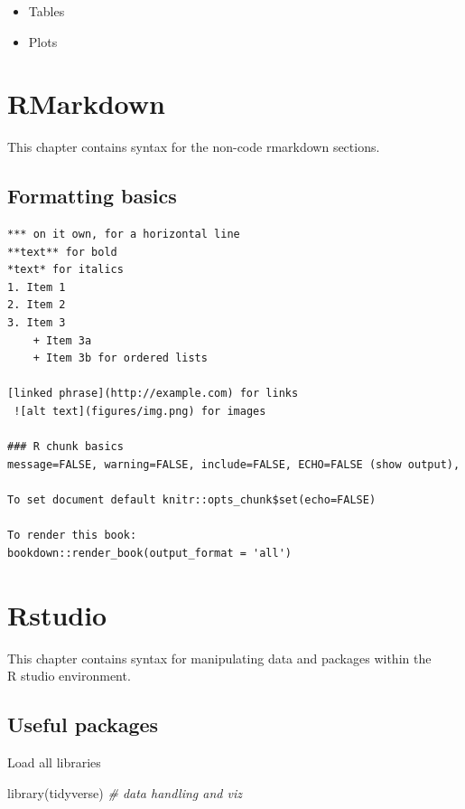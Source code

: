 \documentclass[
]{article}
\newenvironment{Shaded}{\begin{snugshade}}{\end{snugshade}}
\newcommand{\CommentTok}[1]{\textcolor[rgb]{0.56,0.35,0.01}{\textit{#1}}}
\newcommand{\FunctionTok}[1]{\textcolor[rgb]{0.00,0.00,0.00}{#1}}
\newcommand{\NormalTok}[1]{#1}
\providecommand{\tightlist}{%
  \setlength{\itemsep}{0pt}\setlength{\parskip}{0pt}}
\begin{document}
\begin{itemize}
  \begin{itemize}
  \tightlist
  \item
    Tables
  \item
    Plots
  \end{itemize}
\end{itemize}

\hypertarget{rmarkdown}{%
\section{RMarkdown}\label{rmarkdown}}

This chapter contains syntax for the non-code rmarkdown sections.

\hypertarget{formatting-basics}{%
\subsection{Formatting basics}\label{formatting-basics}}

\begin{verbatim}
*** on it own, for a horizontal line
**text** for bold
*text* for italics
1. Item 1
2. Item 2
3. Item 3
    + Item 3a
    + Item 3b for ordered lists
    
[linked phrase](http://example.com) for links
 ![alt text](figures/img.png) for images

### R chunk basics 
message=FALSE, warning=FALSE, include=FALSE, ECHO=FALSE (show output), 

To set document default knitr::opts_chunk$set(echo=FALSE) 

To render this book:
bookdown::render_book(output_format = 'all')
\end{verbatim}

\hypertarget{rstudio}{%
\section{Rstudio}\label{rstudio}}

This chapter contains syntax for manipulating data and packages within the\\
R studio environment.

\hypertarget{useful-packages}{%
\subsection{Useful packages}\label{useful-packages}}

Load all libraries

\begin{Shaded}
\begin{Highlighting}[]
\FunctionTok{library}\NormalTok{(tidyverse) }\CommentTok{\# data handling and viz}
\end{Highlighting}
\end{Shaded}
\end{document}
